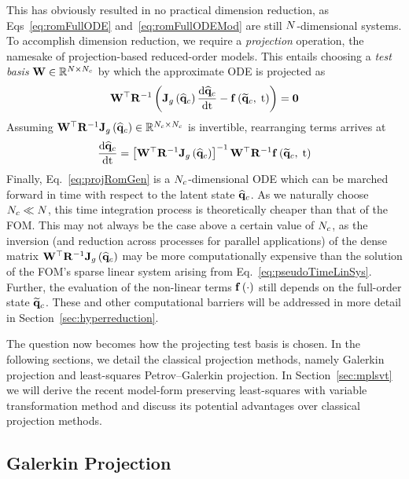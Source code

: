 This has obviously resulted in no practical dimension reduction, as Eqs~\ref{eq:romFullODE} and~\ref{eq:romFullODEMod} are still $N$-dimensional systems. To accomplish dimension reduction, we require a \textit{projection} operation, the namesake of projection-based reduced-order models. This entails choosing a \textit{test basis} $\testBasis \inRTwo{\numDOF}{\numConsModes}$ by which the approximate ODE is projected as
%
\begin{equation}
    \testBasis^\top \resScaleInv \left(\jacobDecodeFunc{\consVecCoef} \ode{\consVecCoef}{\timeVar} - \rhsFunc{\consVecRom, \; \timeVar} \right) = \zeroVec
\end{equation}
%
Assuming $\testBasis^\top \resScaleInv \jacobDecodeFunc{\consVecCoef} \inRTwo{\numConsModes}{\numConsModes}$ is invertible, rearranging terms arrives at
%
\begin{equation}\label{eq:projRomGen}
    \ode{\consVecCoef}{\timeVar} = \left[\testBasis^\top \resScaleInv \jacobDecodeFunc{\consVecCoef}\right]^{-1} \testBasis^\top \resScaleInv \rhsFunc{\consVecRom, \; \timeVar}
\end{equation}
%
Finally, Eq.~\ref{eq:projRomGen} is a $N_c$-dimensional ODE which can be marched forward in time with respect to the latent state $\mathbf{\widehat{q}}_{c}$. As we naturally choose $N_c \ll N$, this time integration process is theoretically cheaper than that of the FOM. This may not always be the case above a certain value of $N_c$, as the inversion (and reduction across processes for parallel applications) of the dense matrix $\testBasis^\top \resScaleInv \jacobDecodeFunc{\consVecCoef}$ may be more computationally expensive than the solution of the FOM's sparse linear system arising from Eq.~\ref{eq:pseudoTimeLinSys}. Further, the evaluation of the non-linear terms $\mathbf{f} \left(\cdot\right)$ still depends on the full-order state $\mathbf{\widetilde{q}}_c$. These and other computational barriers will be addressed in more detail in Section~\ref{sec:hyperreduction}.

The question now becomes how the projecting test basis is chosen. In the following sections, we detail the classical projection methods, namely Galerkin projection and least-squares Petrov--Galerkin projection. In Section~\ref{sec:mplsvt} we will derive the recent model-form preserving least-squares with variable transformation method and discuss its potential advantages over classical projection methods.

\subsection{Galerkin Projection}

